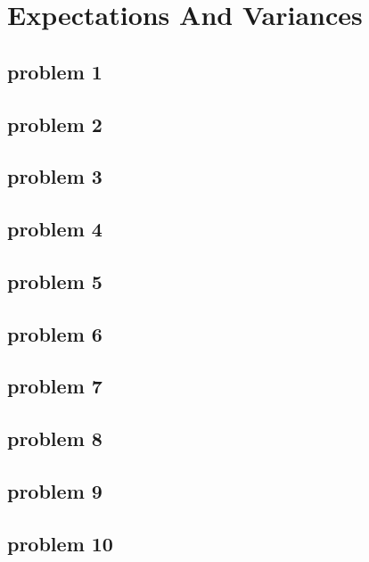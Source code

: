 \section{Expectations And Variances}

\subsection{problem 1}


\subsection{problem 2}


\subsection{problem 3}


\subsection{problem 4}


\subsection{problem 5}


\subsection{problem 6}


\subsection{problem 7}


\subsection{problem 8}


\subsection{problem 9}


\subsection{problem 10}


